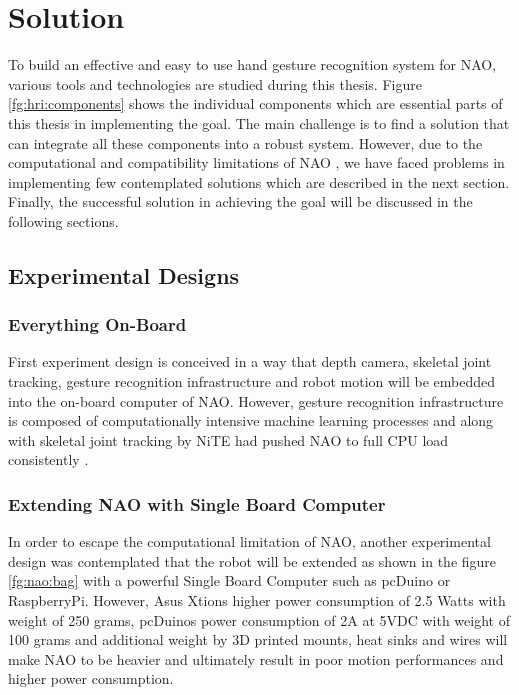\chapter{Solution} \label{ch:solution} To build an effective and easy to use hand gesture recognition system for NAO, various tools and technologies are studied during this thesis. Figure \ref{fg:hri:components} shows the individual components which are essential parts of this thesis in implementing the goal. The main challenge is to find a solution that can integrate all these components into a robust system. However, due to the computational and compatibility limitations of NAO \cite{17}, we have faced problems in implementing few contemplated solutions which are described in the next section. Finally, the successful solution in achieving the goal will be discussed in the following sections.



\section{Experimental Designs} 
\subsection{Everything On-Board} First experiment design is conceived in a way that depth camera, skeletal joint tracking, gesture recognition infrastructure and robot motion will be embedded into the on-board computer of NAO. However, gesture recognition infrastructure is composed of computationally intensive machine learning processes and along with skeletal joint tracking by NiTE had pushed NAO to full CPU load consistently \cite{17}.

\subsection{Extending NAO with Single Board Computer} In order to escape the computational limitation of NAO, another experimental design was contemplated that the robot will be extended as shown in the figure \ref{fg:nao:bag} with a powerful Single Board Computer such as pcDuino or RaspberryPi. However, Asus Xtions higher power consumption of 2.5 Watts with weight of 250 grams, pcDuinos power consumption of 2A at 5VDC with weight of 100 grams and additional weight by 3D printed mounts, heat sinks and wires will make NAO to be heavier and ultimately result in poor motion performances and higher power consumption. 

